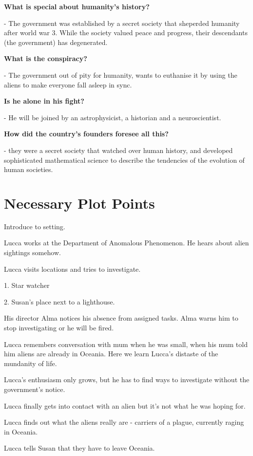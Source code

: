 \documentclass[11pt]{article}
\begin{document}
\textbf{What is special about humanity's history?}

- The government was established by a secret society that sheperded humanity after world war 3. While the society valued peace and progress, their descendants (the government) has degenerated. 


\textbf{What is the conspiracy?}

- The government out of pity for humanity, wants to euthanise it by using the aliens to make everyone fall asleep in sync.


\textbf{Is he alone in his fight?}

- He will be joined by an astrophysicist, a historian and a neuroscientist.


\textbf{How did the country's founders foresee all this?}

- they were a secret society that watched over human history, and developed sophisticated mathematical science to describe the tendencies of the evolution of human societies.


\section{Necessary Plot Points}
Introduce to setting.

Lucca works at the Department of Anomalous Phenomenon. He hears about alien sightings somehow.

Lucca visits locations and tries to investigate. 

1. Star watcher

2. Susan's place next to a lighthouse.

His director Alma notices his absence from assigned tasks. Alma warns him to stop investigating or he will be fired. 

Lucca remembers conversation with mum when he was small, when his mum told him aliens are already in Oceania. Here we learn Lucca's distaste of the mundanity of life.

Lucca's enthusiasm only grows, but he has to find ways to investigate without the government's notice.



Lucca finally gets into contact with an alien but it's not what he was hoping for.



Lucca finds out what the aliens really are - carriers of a plague, currently raging in Oceania.

Lucca tells Susan that they have to leave Oceania.
\end{document}
